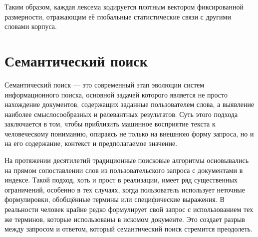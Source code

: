 \documentclass[coursework]{SCWorks}
\begin{document}
Таким образом, каждая лексема кодируется плотным вектором фиксированной размерности, отражающим её глобальные статистические связи с другими словами корпуса.






\section{Семантический поиск}
Семантический поиск — это современный этап эволюции систем информационного поиска, основной задачей которого является не просто нахождение документов, содержащих заданные пользователем слова, а выявление наиболее смыслосообразных и релевантных результатов. Суть этого подхода заключается в том, чтобы приблизить машинное восприятие текста к человеческому пониманию, опираясь не только на внешнюю форму запроса, но и на его содержание, контекст и предполагаемое значение.

На протяжении десятилетий традиционные поисковые алгоритмы основывались на прямом сопоставлении слов из пользовательского запроса с документами в индексе. Такой подход, хоть и прост в реализации, имеет ряд существенных ограничений, особенно в тех случаях, когда пользователь использует неточные формулировки, обобщённые термины или специфические выражения. В реальности человек крайне редко формулирует свой запрос с использованием тех же терминов, которые использованы в искомом документе. Это создает разрыв между запросом и ответом, который семантический поиск стремится преодолеть.
\end{document}
